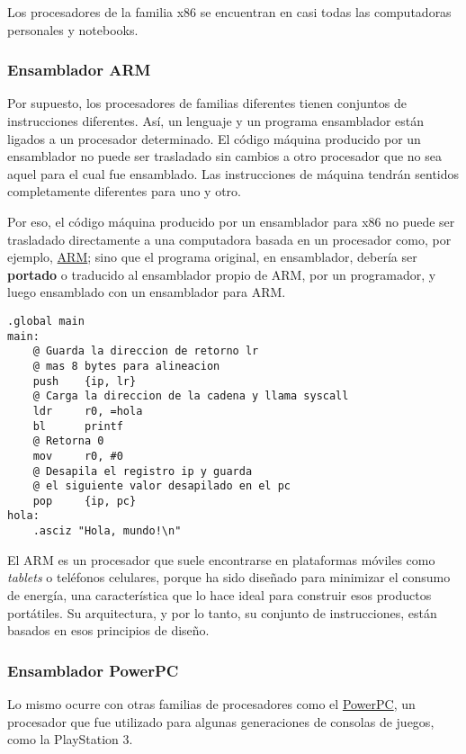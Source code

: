 \documentclass[spanish,A4,]{article}
\begin{document}
Los procesadores de la familia x86 se encuentran en casi todas las
computadoras personales y notebooks.

\subsubsection{Ensamblador ARM}\label{ensamblador-arm}

Por supuesto, los procesadores de familias diferentes tienen conjuntos
de instrucciones diferentes. Así, un lenguaje y un programa ensamblador
están ligados a un procesador determinado. El código máquina producido
por un ensamblador no puede ser trasladado sin cambios a otro procesador
que no sea aquel para el cual fue ensamblado. Las instrucciones de
máquina tendrán sentidos completamente diferentes para uno y otro.

Por eso, el código máquina producido por un ensamblador para x86 no
puede ser trasladado directamente a una computadora basada en un
procesador como, por ejemplo,
\href{https://es.m.wikipedia.org/wiki/Arquitectura_ARM}{ARM}; sino que
el programa original, en ensamblador, debería ser \textbf{portado} o
traducido al ensamblador propio de ARM, por un programador, y luego
ensamblado con un ensamblador para ARM.

\begin{verbatim}
.global main  
main:  
    @ Guarda la direccion de retorno lr 
    @ mas 8 bytes para alineacion
    push    {ip, lr}  
    @ Carga la direccion de la cadena y llama syscall
    ldr     r0, =hola
    bl      printf  
    @ Retorna 0
    mov     r0, #0 
    @ Desapila el registro ip y guarda
    @ el siguiente valor desapilado en el pc 
    pop     {ip, pc}  
hola:  
    .asciz "Hola, mundo!\n"  
\end{verbatim}

El ARM es un procesador que suele encontrarse en plataformas móviles
como \emph{tablets} o teléfonos celulares, porque ha sido diseñado para
minimizar el consumo de energía, una característica que lo hace ideal
para construir esos productos portátiles. Su arquitectura, y por lo
tanto, su conjunto de instrucciones, están basados en esos principios de
diseño.

\subsubsection{Ensamblador PowerPC}\label{ensamblador-powerpc}

Lo mismo ocurre con otras familias de procesadores como el
\href{https://es.m.wikipedia.org/wiki/PowerPC}{PowerPC}, un procesador
que fue utilizado para algunas generaciones de consolas de juegos, como
la PlayStation 3.
\end{document}
